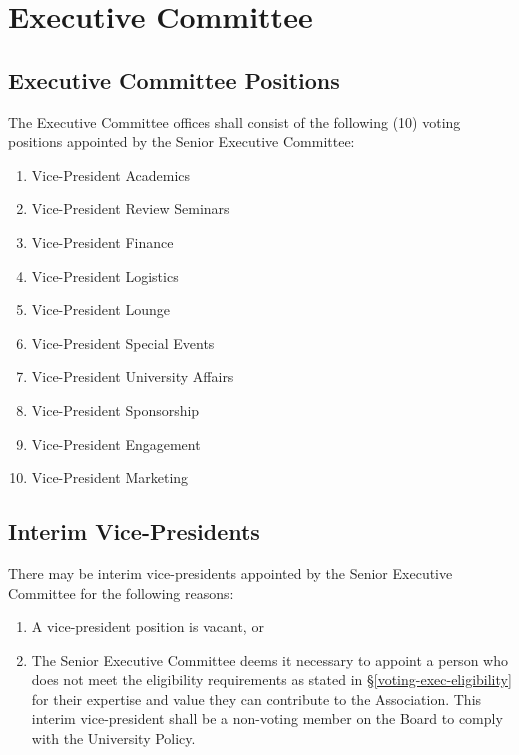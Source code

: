 \section{Executive Committee}

\subsection{Executive Committee Positions}
The Executive Committee offices shall consist of the following
(10) voting positions appointed by the Senior Executive
Committee:
\begin{enumerate}

    \item Vice-President Academics
    \item Vice-President Review Seminars
    \item Vice-President Finance
    \item Vice-President Logistics
    \item Vice-President Lounge
    \item Vice-President Special Events
    \item Vice-President University Affairs
    \item Vice-President Sponsorship
    \item Vice-President Engagement
    \item Vice-President Marketing

\end{enumerate}

\subsection{Interim Vice-Presidents}
There may be interim vice-presidents
appointed by the Senior Executive Committee for the following reasons:
\begin{enumerate}
    
    \item A vice-president position is vacant, or
    
    \item The Senior Executive Committee deems it necessary to appoint
    a person who does not meet the eligibility requirements as stated
    in \S\ref{voting-exec-eligibility} for their expertise and
    value they can contribute to the Association. This interim
    vice-president shall be a non-voting member on the Board to
    comply with the University Policy.
\end{enumerate}

